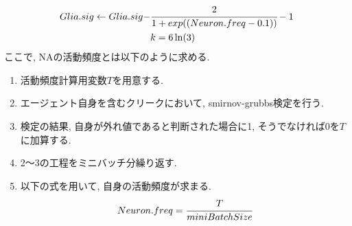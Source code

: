 \documentclass[a4paper,10.5pt,twocolumn]{jsarticle}
\begin{document}

\begin{align}
  Glia.sig\leftarrow Glia.sig-&\displaystyle \cfrac{2}{1+exp((Neuron.freq-0.1))}-1\\
  &k=6\ln(3)
  \label{eq:new}
\end{align}
ここで, NAの活動頻度とは以下のように求める.
\begin{enumerate}
  \item 活動頻度計算用変数$T$を用意する.
  \item エージェント自身を含むクリークにおいて, 
  smirnov-grubbs検定を行う.
  \item 検定の結果, 自身が外れ値であると判断された場合に1, そうでなければ0を$T$に加算する.
  \item 2〜3の工程をミニバッチ分繰り返す.
  \item 以下の式を用いて, 自身の活動頻度が求まる.
  \vspace{-2zh}
  \begin{align}
    Neuron.freq=\cfrac{T}{miniBatchSize}
  \end{align}
\end{enumerate} 
\end{document}
